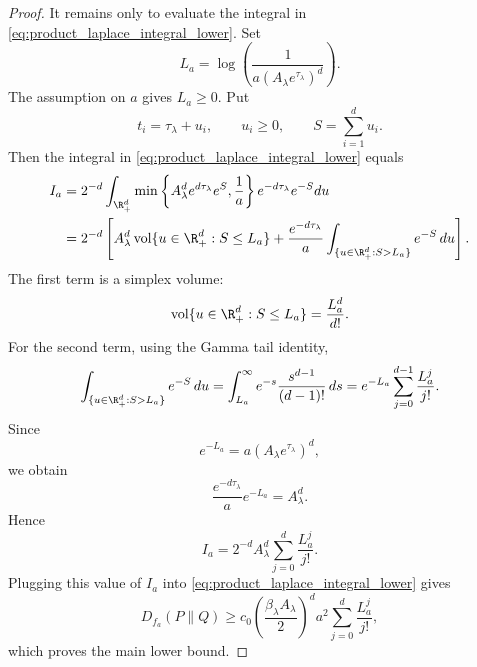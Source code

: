 \begin{proof}
    It remains only to evaluate the integral in
    \eqref{eq:product_laplace_integral_lower}. Set
    \[
        L_a
        =
        \log\left(
        \frac{1}{a(A_\lambda e^{\tau_\lambda})^d}
        \right).
    \]
    The assumption on $a$ gives $L_a\ge0$.  Put
    \[
        t_i=\tau_\lambda+u_i,
        \qquad
        u_i\ge0,
        \qquad
        S=\sum_{i=1}^d u_i.
    \]
    Then the integral in \eqref{eq:product_laplace_integral_lower} equals
    \[
        \begin{aligned}
            I_a
             & =
            2^{-d}
            \int_{\R_+^d}
            \min\left\{
            A_\lambda^d e^{d\tau_\lambda}e^S,
            \frac1a
            \right\}
            e^{-d\tau_\lambda}e^{-S}
            du
            \\
             & =
            2^{-d}
            \left[
                A_\lambda^d
                \operatorname{vol}\{u\in\R_+^d:S\le L_a\}
                +
                \frac{e^{-d\tau_\lambda}}{a}
                \int_{\{u\in\R_+^d:S>L_a\}} e^{-S}\,du
                \right].
        \end{aligned}
    \]
    The first term is a simplex volume:
    \[
        \operatorname{vol}\{u\in\R_+^d:S\le L_a\}
        =
        \frac{L_a^d}{d!}.
    \]
    For the second term, using the Gamma tail identity,
    \[
        \int_{\{u\in\R_+^d:S>L_a\}} e^{-S}\,du
        =
        \int_{L_a}^{\infty}
        e^{-s}\frac{s^{d-1}}{(d-1)!}\,ds
        =
        e^{-L_a}\sum_{j=0}^{d-1}\frac{L_a^j}{j!}.
    \]
    Since
    \[
        e^{-L_a}=a(A_\lambda e^{\tau_\lambda})^d,
    \]
    we obtain
    \[
        \frac{e^{-d\tau_\lambda}}{a}
        e^{-L_a}
        =
        A_\lambda^d.
    \]
    Hence
    \[
        I_a
        =
        2^{-d}A_\lambda^d
        \sum_{j=0}^d
        \frac{L_a^j}{j!}.
    \]
    Plugging this value of $I_a$ into
    \eqref{eq:product_laplace_integral_lower} gives
    \[
        D_{f_a}(P\|Q)
        \ge
        c_0
        \left(\frac{\beta_\lambda A_\lambda}{2}\right)^d
        a^2
        \sum_{j=0}^d
        \frac{L_a^j}{j!},
    \]
    which proves the main lower bound.


\end{proof}
